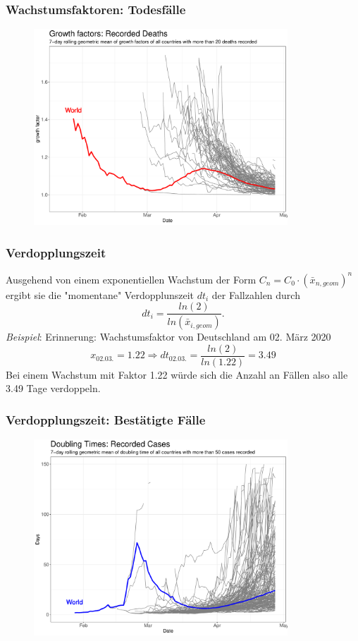 \documentclass{beamer}
\begin{document}
\begin{frame}
	\frametitle{Wachstumsfaktoren: Todesfälle}
	\begin{figure}
		\centering
		\includegraphics[width = 270pt]{GF_deaths}
	\end{figure}
\end{frame}

\begin{frame}
	\frametitle{Verdopplungszeit}
	Ausgehend von einem exponentiellen Wachstum der Form $C_n = C_0 \cdot (\bar{x}_{n, geom})^{n}$ ergibt sie die "momentane" Verdopplunszeit $dt_i$ der Fallzahlen durch $$dt_i = \frac{ln(2)}{ln(\bar{x}_{i, geom})}.$$
	\pause
	\emph{Beispiel}: Erinnerung: Wachstumsfaktor von Deutschland am 02. März 2020 $$x_{02.03.} = 1.22 \Rightarrow dt_{02.03.} = \frac{ln(2)}{ln(1.22)} = 3.49$$ 
	\pause
	Bei einem Wachstum mit Faktor 1.22 würde sich die Anzahl an Fällen also alle 3.49 Tage verdoppeln.
	
\end{frame}

\begin{frame}
	\frametitle{Verdopplungszeit: Bestätigte Fälle}
	\begin{figure}
		\centering
		\includegraphics[width = 270pt]{DT_confirmed}
	\end{figure}
\end{frame}
\end{document}
